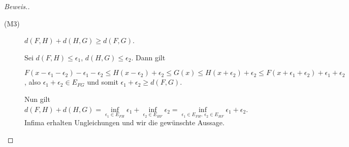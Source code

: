\begin{proof}[Beweis.]
\begin{description}
    \item[(M3)] $d(F,H) + d(H,G) \geq d(F,G)$.

    Sei $d(F,H) \leq \epsilon_1$, $d(H,G) \leq \epsilon_2$. Dann gilt 

    $F(x - \epsilon_1 - \epsilon_2) - \epsilon_1 - \epsilon_2 \leq H(x - \epsilon_2) + \epsilon_2 \leq G(x) \leq H(x + \epsilon_2) +\epsilon_2 \leq F(x + \epsilon_1 + \epsilon_2) + \epsilon_1 + \epsilon_2$, also $\epsilon_1+\epsilon_2 \in E_{FG}$ und somit $\epsilon_1 +\epsilon_2 \geq d(F,G)$.

    Nun gilt $d(F,H) + d(H,G) = \inf\limits_{\epsilon_1 \in E_{FH}} \epsilon_1 + \inf\limits_{\epsilon_2 \in E_{HF}} \epsilon_2 = \inf\limits_{\epsilon_1 \in E_{FH},~\epsilon_2 \in E_{HF}} \epsilon_1 + \epsilon_2$. Infima erhalten Ungleichungen und wir die gewünschte Aussage.
    \end{description}
\end{proof}


